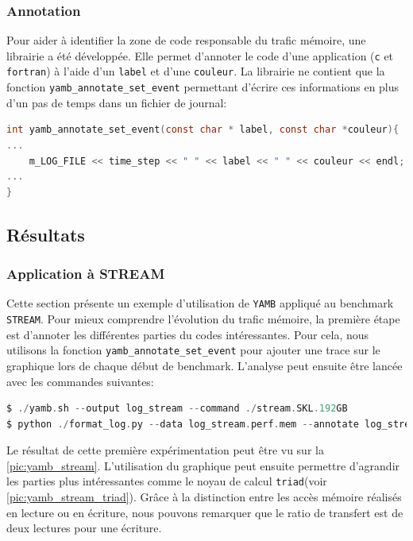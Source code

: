     \subsubsection{Annotation}

        Pour aider à identifier la zone de code responsable du trafic mémoire, une librairie a été développée. Elle permet d'annoter le code d'une application (\verb=c= et \verb=fortran=) à l'aide d'un \verb=label= et d'une \verb=couleur=. La librairie ne contient que la fonction \verb=yamb_annotate_set_event= permettant d'écrire ces informations en plus d'un pas de temps dans un fichier de journal:
\begin{lstlisting}[label=lst:yamb_api ,language=C]
int yamb_annotate_set_event(const char * label, const char *couleur){
...
    m_LOG_FILE << time_step << " " << label << " " << couleur << endl;
...
}
\end{lstlisting}
    


\subsection{Résultats}


    \subsubsection{Application à STREAM}

        Cette section présente un exemple d'utilisation de \verb=YAMB= appliqué au benchmark \verb=STREAM=. Pour mieux comprendre l'évolution du trafic mémoire, la première étape est d'annoter les différentes parties du codes intéressantes. Pour cela, nous utilisons la fonction \verb=yamb_annotate_set_event= pour ajouter une trace sur le graphique lors de chaque début de benchmark. L'analyse peut ensuite être lancée avec les commandes suivantes:
    
\begin{lstlisting}[label=lst:yamb_api ,language=C]
$ ./yamb.sh --output log_stream --command ./stream.SKL.192GB
$ python ./format_log.py --data log_stream.perf.mem --annotate log_stream.annotate
\end{lstlisting}

        Le résultat de cette première expérimentation peut être vu sur la \autoref{pic:yamb_stream}. L'utilisation du graphique peut ensuite permettre d'agrandir les parties plus intéressantes comme le noyau de calcul \verb=triad=(voir \autoref{pic:yamb_stream_triad}). Grâce à la distinction entre les accès mémoire réalisés en lecture ou en écriture, nous pouvons remarquer que le ratio de transfert est de deux lectures pour une écriture.
        
